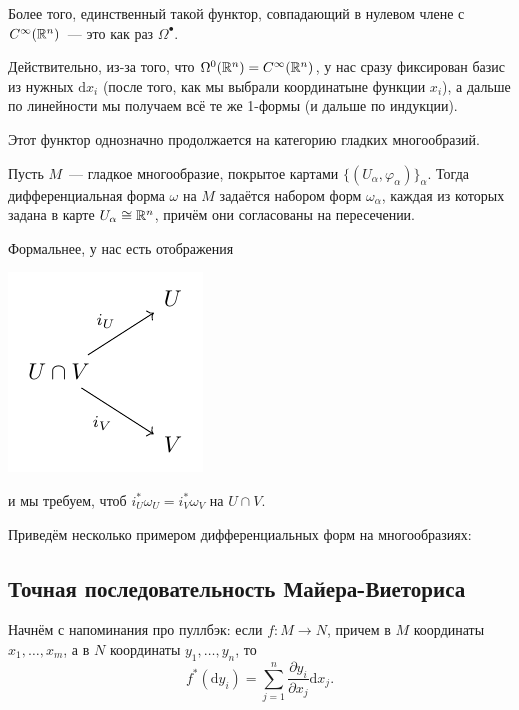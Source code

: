 	Более того, единственный такой функтор, совпадающий в нулевом члене с $C^{\infty}(\mathbb{R}^n)$~---  это как раз $\Omega^{\bullet}$.

	Действительно, из-за того, что $\Omega^{0}(\mathbb{R}^n) = C^{\infty}(\mathbb{R}^n)$, у нас сразу фиксирован базис из нужных $\mathrm{d}x_i$ (после того, как мы выбрали координатыне функции $x_i$), а дальше по линейности мы получаем всё те же 1-формы (и дальше по индукции). 
 

 	Этот функтор однозначно продолжается на категорию гладких многообразий. 

 	\begin{definition} 
 		Пусть $M$~--- гладкое многообразие, покрытое картами $\{ (U_{\alpha}, \varphi_{\alpha}) \}_{\alpha}$. Тогда дифференциальная форма $\omega$ на $M$ задаётся набором форм $\omega_{\alpha}$, каждая из которых задана в карте $U_{\alpha} \cong \mathbb{R}^n$, причём они согласованы на пересечении. 

 		Формальнее, у нас есть отображения 
 		\begin{center}
 			\includegraphics{lectures/7/pictures/cd_3.pdf}
 		\end{center}
 		и мы требуем, чтоб $i^*_{U} \omega_U = i^*_V \omega_V$ на $U \cap V$. 
 	\end{definition}

 	\begin{example}
 		Приведём несколько примером дифференциальных форм на многообразиях: 


 	\end{example}

 	\subsection{Точная последовательность Майера-Виеториса}

 	Начнём с напоминания про пуллбэк: если $f\colon M \to N$, причем в $M$ координаты $x_1, \ldots, x_m$,  а в $N$ координаты $y_1, \ldots, y_n$, то 
 	\[
 		f^{*}(\mathrm{d}y_i) = \sum_{j = 1}^n \frac{\partial y_i}{\partial x_j} \mathrm{d}x_j.
 	\] 

